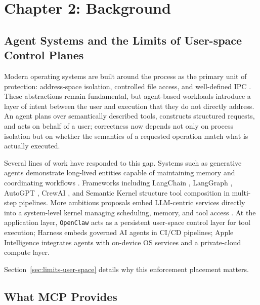 \section*{Chapter 2: Background}
\setcounter{section}{2} \setcounter{subsection}{0}
 \label{chap:background} 



\subsection{Agent Systems and the Limits of User-space Control Planes}

Modern operating systems are built around the process as the primary unit of protection: address-space isolation, controlled file access, and well-defined IPC \cite{tanenbaum2022}.
These abstractions remain fundamental, but agent-based workloads introduce a layer of intent between the user and execution that they do not directly address.
An agent plans over semantically described tools, constructs structured requests, and acts on behalf of a user; correctness now depends not only on process isolation but on whether the semantics of a requested operation match what is actually executed.

Several lines of work have responded to this gap.
Systems such as generative agents demonstrate long-lived entities capable of maintaining memory and coordinating workflows \cite{park2023generative}.
Frameworks including LangChain \cite{langchain2022}, LangGraph \cite{langgraph2024}, AutoGPT \cite{autogpt2023}, CrewAI \cite{crewai2024}, and Semantic Kernel \cite{semantickernel2023} structure tool composition in multi-step pipelines.
More ambitious proposals embed LLM-centric services directly into a system-level kernel managing scheduling, memory, and tool access \cite{packer2023memgpt, wu2024oscopilot, mei2024aios, liu2026agentos}.
At the application layer, \texttt{OpenClaw} \cite{openclaw2026} acts as a persistent user-space control layer for tool execution; Harness \cite{harness2025} embeds governed AI agents in CI/CD pipelines; Apple Intelligence \cite{apple2024pcc} integrates agents with on-device OS services and a private-cloud compute layer.

Section~\ref{sec:limits-user-space} details why this enforcement placement matters.



\subsection{What MCP Provides}

